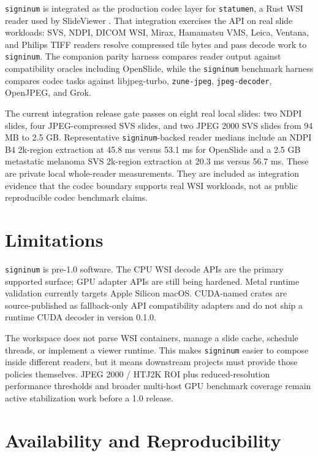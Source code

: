 \documentclass[11pt]{article}
\newcommand{\signinum}{\texttt{signinum}}
\newcommand{\crate}[1]{\texttt{#1}}
\begin{document}
\signinum{} is integrated as the production codec layer for \crate{statumen}, a
Rust WSI reader used by SlideViewer \citep{wsirs}. That integration exercises
the API on real slide workloads: SVS, NDPI, DICOM WSI, Mirax, Hamamatsu VMS,
Leica, Ventana, and Philips TIFF readers resolve compressed tile bytes and
pass decode work to \signinum{}. The companion parity harness compares reader
output against compatibility oracles including OpenSlide, while the \signinum{}
benchmark harness compares codec tasks against
libjpeg-turbo, \crate{zune-jpeg}, \crate{jpeg-decoder}, OpenJPEG, and Grok.

The current integration release gate passes on eight real local slides: two
NDPI slides, four JPEG-compressed SVS slides, and two JPEG 2000 SVS slides
from 94 MB to 2.5 GB. Representative \signinum-backed reader medians include an
NDPI B4 2k-region extraction at 45.8 ms versus 53.1 ms for OpenSlide and a
2.5 GB metastatic melanoma SVS 2k-region extraction at 20.3 ms versus 56.7 ms.
These are private local whole-reader measurements. They are included as
integration evidence that the codec boundary supports real WSI workloads, not
as public reproducible codec benchmark claims.

\section{Limitations}

\signinum{} is pre-1.0 software. The CPU WSI decode APIs are the primary
supported surface; GPU adapter APIs are still being hardened. Metal runtime
validation currently targets Apple Silicon macOS. CUDA-named crates are
source-published as fallback-only API compatibility adapters and do not ship a
runtime CUDA decoder in version 0.1.0.

The workspace does not parse WSI containers, manage a slide cache, schedule
threads, or implement a viewer runtime. This makes \signinum{} easier to compose
inside different readers, but it means downstream projects must provide those
policies themselves. JPEG 2000 / HTJ2K ROI plus reduced-resolution performance
thresholds and broader multi-host GPU benchmark coverage remain active
stabilization work before a 1.0 release.

\section{Availability and Reproducibility}
\end{document}
